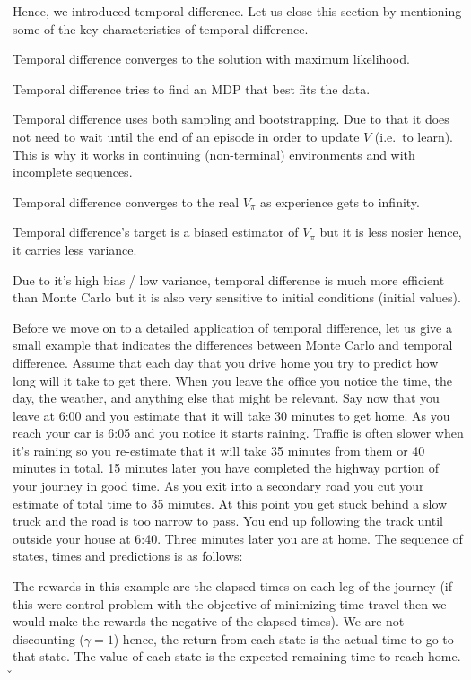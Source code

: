 Hence, we introduced temporal difference. Let us close this section by mentioning some of the key characteristics of
temporal difference.
\bit
\item Temporal difference converges to the solution with maximum likelihood.
\item Temporal difference tries to find an MDP that best fits the data.
\item Temporal difference uses both sampling and bootstrapping. Due to that it does not need to wait until the end of
an episode in order to update $V$ (i.e.\ to learn). This is why it works in continuing (non-terminal) environments and
with incomplete sequences.
\item Temporal difference converges to the real $V_\pi$ as experience gets to infinity.
\item Temporal difference's target is a biased estimator of $V_\pi$ but it is less nosier hence, it carries less
variance.
\item Due to it's high bias / low variance, temporal difference is much more efficient than Monte Carlo but it is also
very sensitive to initial conditions (initial values).
\eit

\be
Before we move on to a detailed application of temporal difference, let us give a small example that indicates the
differences between Monte Carlo and temporal difference. Assume that each day that you drive home you try to predict
how long will it take to get there. When you leave the office you notice the time, the day, the weather, and anything
else that might be relevant. Say now that you leave at 6:00 and you estimate that it will take 30 minutes to get home. 
As you reach your car is 6:05 and you notice it starts raining. Traffic is often slower when it's raining so you
re-estimate that it will take 35 minutes from them or 40 minutes in total. 15 minutes later you have completed the
highway portion of your journey in good time. As you exit into a secondary road you cut your estimate of total time
to 35 minutes. At this point you get stuck behind a slow truck and the road is too narrow to pass. You end up
following the track until outside your house at 6:40. Three minutes later you are at home. The sequence of states,
times and predictions is as follows:


The rewards in this example are the elapsed times on each leg of the journey (if this were control problem with the
objective of minimizing time travel then we would make the rewards the negative of the elapsed times). We are not
discounting ($\gamma=1$) hence, the return from each state is the actual time to go to that state. The value of each
state is the expected remaining time to reach home. \v

